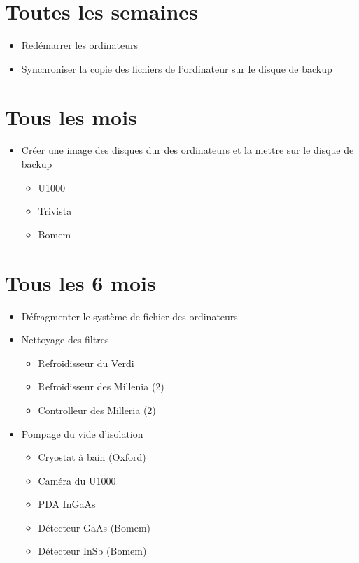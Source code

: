 %
%

\section{Toutes les semaines}\label{toutes-les-semaines}

\begin{itemize}

\item
  Redémarrer les ordinateurs
\item
  Synchroniser la copie des fichiers de l'ordinateur sur le disque de
  backup
\end{itemize}

\section{Tous les mois}\label{tous-les-mois}

\begin{itemize}

\item
  Créer une image des disques dur des ordinateurs et la mettre sur le
  disque de backup

  \begin{itemize}
  
  \item
    U1000
  \item
    Trivista
  \item
    Bomem
  \end{itemize}
\end{itemize}

\section{Tous les 6 mois}\label{tous-les-6-mois}

\begin{itemize}

\item
  Défragmenter le système de fichier des ordinateurs
\item
  Nettoyage des filtres

  \begin{itemize}
  
  \item
    Refroidisseur du Verdi
  \item
    Refroidisseur des Millenia (2)
  \item
    Controlleur des Milleria (2)
  \end{itemize}
\item
  Pompage du vide d'isolation

  \begin{itemize}
  
  \item
    Cryostat à bain (Oxford)
  \item
    Caméra du U1000
  \item
    PDA InGaAs
  \item
    Détecteur GaAs (Bomem)
  \item
    Détecteur InSb (Bomem)
  \end{itemize}
\end{itemize}
